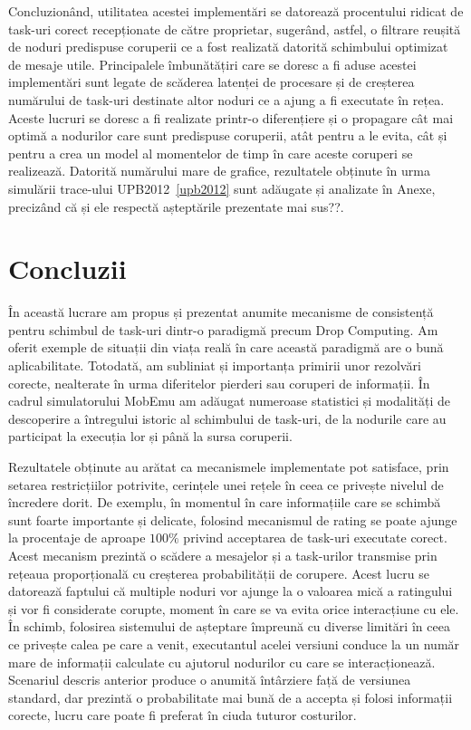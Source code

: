 \documentclass[12pt,a4paper]{report}
\begin{document}
Concluzionând, utilitatea acestei implementări se datorează procentului ridicat de task-uri corect recepționate de către proprietar, sugerând, astfel, o filtrare reușită de noduri predispuse coruperii ce a fost realizată datorită schimbului optimizat de mesaje utile. Principalele îmbunătățiri care se doresc a fi aduse acestei implementări sunt legate de scăderea latenței de procesare și de creșterea numărului de task-uri destinate altor noduri ce a ajung a fi executate în rețea. Aceste lucruri se doresc a fi realizate printr-o diferențiere și o propagare cât mai optimă a nodurilor care sunt predispuse coruperii, atât pentru a le evita, cât și pentru a crea un model al momentelor de timp în care aceste coruperi se realizează. Datorită numărului mare de grafice, rezultatele obținute în urma simulării trace-ului UPB2012~\ref{upb2012} sunt adăugate și analizate în Anexe, precizând că și ele respectă așteptările prezentate mai sus??. 

\chapter{Concluzii} \label{concluzii}
În această lucrare am propus și prezentat anumite mecanisme de consistență pentru schimbul de task-uri dintr-o paradigmă precum Drop Computing. Am oferit exemple de situații din viața reală în care această paradigmă are o bună aplicabilitate. Totodată, am subliniat și importanța primirii unor rezolvări corecte, nealterate în urma diferitelor pierderi sau coruperi de informații. În cadrul simulatorului MobEmu am adăugat numeroase statistici și modalități de descoperire a întregului istoric al schimbului de task-uri, de la nodurile care au participat la execuția lor și până la sursa coruperii.

Rezultatele obținute au arătat ca mecanismele implementate pot satisface, prin setarea restricțiilor potrivite, cerințele unei rețele în ceea ce privește nivelul de încredere dorit. De exemplu, în momentul în care informațiile care se schimbă sunt foarte importante și delicate, folosind mecanismul de rating se poate ajunge la procentaje de aproape $100\%$ privind acceptarea de task-uri executate corect. Acest mecanism prezintă o scădere a mesajelor și a task-urilor transmise prin rețeaua proporțională cu creșterea probabilității de corupere. Acest lucru se datorează faptului că multiple noduri vor ajunge la o valoarea mică a ratingului și vor fi considerate corupte, moment în care se va evita orice interacțiune cu ele. În schimb, folosirea sistemului de așteptare împreună cu diverse limitări în ceea ce privește calea pe care a venit, executantul acelei versiuni conduce la un număr mare de informații calculate cu ajutorul nodurilor cu care se interacționează. Scenariul descris anterior produce o anumită întârziere față de versiunea standard, dar prezintă o probabilitate mai bună de a accepta și folosi informații corecte, lucru care poate fi preferat în ciuda tuturor costurilor.
\end{document}
